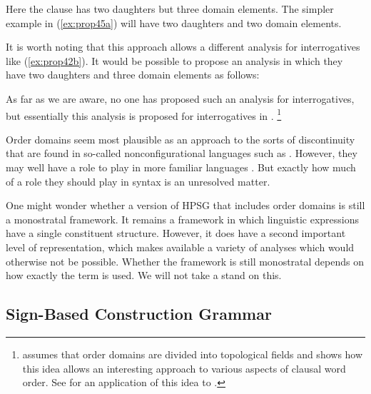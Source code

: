 \documentclass[output=paper
	        ,collection
	        ,collectionchapter
 	        ,biblatex
                ,babelshorthands
                ,newtxmath
                ,draftmode
                ,colorlinks, citecolor=brown
]{langscibook}
\begin{document}
\ea\label{ex:prop46}
\z

\noindent
Here the clause has two daughters but three domain elements. The simpler example in (\ref{ex:prop45a}) will have two daughters and two domain elements.

It is worth noting that this approach allows a different analysis for interrogatives like (\ref{ex:prop42b}). It would be possible to propose an analysis in which they have two daughters and three domain elements as follows:

\ea\label{ex:prop47}
\z

\noindent
As far as we are aware, no one has proposed such an analysis for  interrogatives, but
essentially this analysis is proposed for  interrogatives in \citet[81]{Kathol2000a}.%
%
\footnote{\citet{Kathol2000a} assumes that order domains are divided into topological fields and
  shows how this idea allows an interesting approach to various aspects of clausal word order. See
  \citet{Borsley:06} for an application of this idea to .} 
%

Order domains seem most plausible as an approach to the sorts of discontinuity that are found in
so-called nonconfigurational languages such as  \citep{DS99a}. However, they may well
have a role to play in more familiar languages \citep{BGM99a,Chaves2014a-u}. But exactly how much of
a role they should play in syntax is an unresolved matter. 

One might wonder whether a version of HPSG that includes order domains is still a monostratal
framework. It remains a framework in which linguistic expressions have a single constituent
structure. However, it does have a second important level of representation, which makes available a
variety of analyses which would otherwise not be possible. Whether the framework is still
monostratal depends on how exactly the term is used. We will not take a stand on this. 

\subsection{Sign-Based Construction Grammar}\label{sec:prop7.2}
\label{prop:sec-sbcg}
\end{document}
